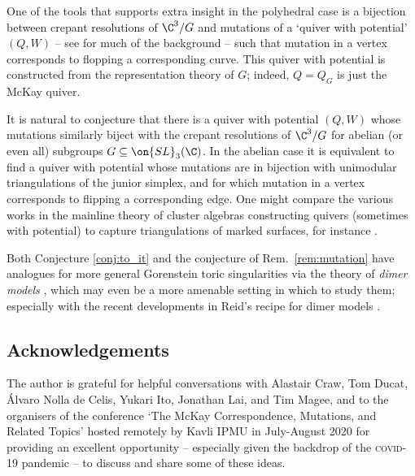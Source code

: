 \documentclass[leqno,11pt,a4paper]{amsart}
\begin{document}
\begin{remark} \label{rem:mutation} One of the tools that supports extra insight in the polyhedral case is a bijection between crepant resolutions of $\C^3/G$ and mutations of a `quiver with potential' $(Q,W)$ -- see \cite{dwz_qui_08,dwz_qui_10} for much of the background -- such that mutation in a vertex corresponds to flopping a corresponding curve. This quiver with potential is constructed from the representation theory of $G$; indeed, $Q=Q_G$ is just the McKay quiver.

It is natural to conjecture that there is a quiver with potential $(Q,W)$ whose mutations similarly biject with the crepant resolutions of $\C^3/G$ for abelian (or even all) subgroups $G\subseteq\on{SL}_3(\C)$. In the abelian case it is equivalent to find a quiver with potential whose mutations are in bijection with unimodular triangulations of the junior simplex, and for which mutation in a vertex corresponds to flipping a corresponding edge. One might compare the various works in the mainline theory of cluster algebras constructing quivers (sometimes with potential) to capture triangulations of marked surfaces, for instance \cite{lab_tri_16,fst_clu_08,ft_clu_08}.
\end{remark}

\begin{remark} Both Conjecture \ref{conj:to_it} and the conjecture of Rem.~\ref{rem:mutation} have analogues for more general Gorenstein toric singularities via the theory of \emph{dimer models} \cite{bcv_geo_15,iu_dim_16}, which may even be a more amenable setting in which to study them; especially with the recent developments in Reid's recipe for dimer models \cite{cht_com_20}.
\end{remark}

\subsection*{Acknowledgements} The author is grateful for helpful conversations with Alastair Craw, Tom Ducat, \'Alvaro Nolla de Celis, Yukari Ito, Jonathan Lai, and Tim Magee, and to the organisers of the conference `The McKay Correspondence, Mutations, and Related Topics' hosted remotely by Kavli IPMU in July-August 2020 for providing an excellent opportunity -- especially given the backdrop of the \textsc{covid-19} pandemic -- to discuss and share some of these ideas.



\end{document}
